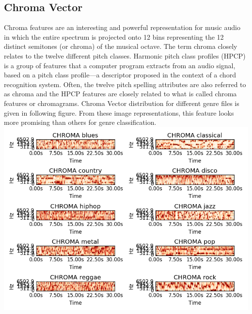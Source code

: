 \documentclass[conference]{IEEEtran}
\begin{document}
\subsection{Chroma Vector}
Chroma features are an interesting and powerful representation for music audio in which the entire spectrum is projected onto 12 bins representing the 12 distinct semitones (or chroma) of the musical octave. The term chroma closely relates to the twelve different pitch classes. Harmonic pitch class profiles (HPCP) is a group of features that a computer program extracts from an audio signal, based on a pitch class profile—a descriptor proposed in the context of a chord recognition system. Often, the twelve pitch spelling attributes are also referred to as chroma and the HPCP features are closely related to what is called chroma features or chromagrams\cite{wiki}.
Chroma Vector distribution for different genre files is given in following figure. From these image representations, this feature looks more promising than others for genre classification.\\
\includegraphics[width=\columnwidth]{CHROMA_fig}
\end{document}
